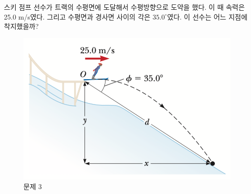 \documentclass[floatfix,nofootinbib,superscriptaddress,fleqn,preprint]{revtex4}
\begin{document}
스키 점프 선수가 트랙의 수평면에 도달해서
수평방향으로 도약을 했다. 이 때 속력은 25.0 m/s였다. 그리고 수평면과
경사면 사이의 각은 $35.0^\circ$였다. 이 선수는 어느 지점에 착지했을까? 
\begin{figure}[ht]
  \centering
\includegraphics[scale=0.6]{Qfig4-3.pdf}  
  \caption{문제 3}
  \label{fig:2}
\end{figure}
\end{document}
